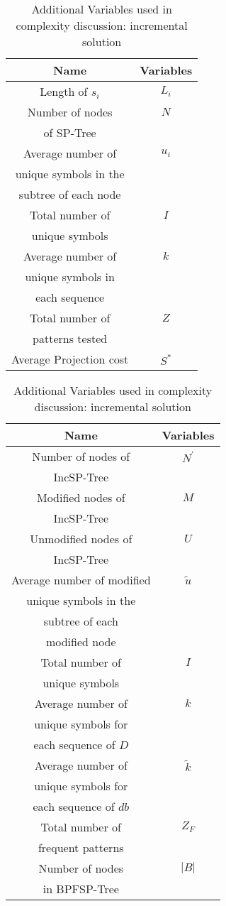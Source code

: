 \begin{table}
\parbox{.49\linewidth}{
\centering
\begin{tabular}{|c|c|}
\hline
Name & Variables\\
\hline
Length of $s_{i}$ & $L_{i}$ \\ \hline
Number of nodes  & $N$ \\ 
of SP-Tree & \\ \hline
Average number of  & $u_{i}$ \\
unique symbols in the & \\ 
subtree of each node &  \\ \hline
Total number of & $I$ \\ 
unique symbols & \\ 
\hline
Average number of  &  $k$ \\ 
unique symbols in & \\
each sequence & \\ \hline
Total number of  & $Z$ \\ 
patterns tested & \\
\hline
Average Projection cost & $S^{*}$ \\ \hline
\end{tabular}
\caption{Additional Variables used in complexity discussion: static solution}
\label{table:variables_complexity_tree_miner}
}
\hfill
\parbox{.49\linewidth}{
\centering
\begin{tabular}{|c|c|}
\hline
Name & Variables\\
\hline
Number of nodes of  & $N^{\prime}$ \\ 
IncSP-Tree & \\ 
\hline
Modified nodes of  & $M$ \\ 
IncSP-Tree & \\ 
\hline
Unmodified nodes of  & $U$ \\ 
IncSP-Tree & \\ 
\hline
Average number of modified  & $\widetilde{u}$ \\ 
unique symbols in the & \\ 
subtree of each  &  \\ 
modified node & \\ 
\hline
Total number of  & $I$ \\ 
unique symbols & \\ 
\hline
Average number of  &  $k$ \\ 
unique symbols for & \\ 
each sequence of $D$ & \\ 
\hline
Average number of & $\widetilde{k}$  \\ 
 unique symbols for & \\ 
each sequence of $db$ &  \\ 
\hline
Total number of  & $Z_{F}$ \\ 
frequent patterns & \\ 
\hline
Number of nodes & $|B|$ \\ 
in BPFSP-Tree & \\ 
\hline
\end{tabular}
\caption{Additional Variables used in complexity discussion: incremental solution}
\label{table:variables_complexity_inc_tree_miner}
}
\end{table}


